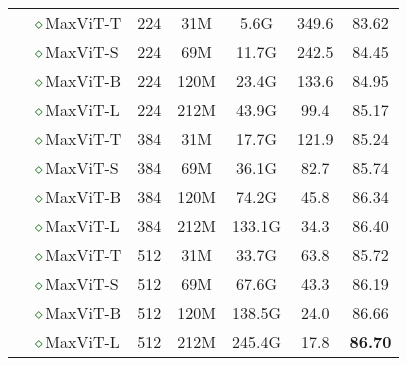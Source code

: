 \documentclass[runningheads]{llncs}
\begin{document}
\begin{table*}[!t]
\begin{tabular}{c|l|ccccc}
\cmidrule(lr){2-7}
& \textcolor{darkgreen}{$\diamond$}MaxViT-T  & 224 & 31M & 5.6G & 349.6 & 83.62 \\
& \textcolor{darkgreen}{$\diamond$}MaxViT-S  & 224 & 69M & 11.7G & 242.5 & 84.45 \\
& \textcolor{darkgreen}{$\diamond$}MaxViT-B & 224 & 120M & 23.4G & 133.6 & 84.95 \\
& \textcolor{darkgreen}{$\diamond$}MaxViT-L  & 224 &  212M & 43.9G & 99.4 & 85.17 \\
\cmidrule(lr){2-7}
& \textcolor{darkgreen}{$\diamond$}MaxViT-T  & 384 & 31M & 17.7G & 121.9 & 85.24 \\
& \textcolor{darkgreen}{$\diamond$}MaxViT-S & 384 & 69M & 36.1G & 82.7 & 85.74 \\
& \textcolor{darkgreen}{$\diamond$}MaxViT-B & 384 & 120M & 74.2G & 45.8 & 86.34\\
& \textcolor{darkgreen}{$\diamond$}MaxViT-L & 384 &  212M & 133.1G & 34.3 & 86.40 \\
\cmidrule(lr){2-7}
& \textcolor{darkgreen}{$\diamond$}MaxViT-T & 512 & 31M & 33.7G &  63.8 & 85.72 \\
& \textcolor{darkgreen}{$\diamond$}MaxViT-S & 512 & 69M & 67.6G & 43.3 & 86.19 \\
& \textcolor{darkgreen}{$\diamond$}MaxViT-B & 512 & 120M & 138.5G & 24.0 & 86.66 \\
& \textcolor{darkgreen}{$\diamond$}MaxViT-L & 512 &  212M & 245.4G & 17.8 & \textbf{86.70} \\
\end{tabular}
\end{table*}
\end{document}
